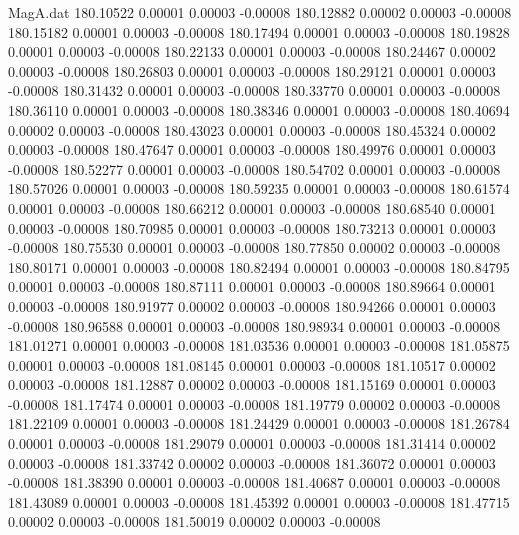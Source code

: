 \begin{filecontents}{MagA.dat}
 180.10522    0.00001    0.00003   -0.00008
 180.12882    0.00002    0.00003   -0.00008
 180.15182    0.00001    0.00003   -0.00008
 180.17494    0.00001    0.00003   -0.00008
 180.19828    0.00001    0.00003   -0.00008
 180.22133    0.00001    0.00003   -0.00008
 180.24467    0.00002    0.00003   -0.00008
 180.26803    0.00001    0.00003   -0.00008
 180.29121    0.00001    0.00003   -0.00008
 180.31432    0.00001    0.00003   -0.00008
 180.33770    0.00001    0.00003   -0.00008
 180.36110    0.00001    0.00003   -0.00008
 180.38346    0.00001    0.00003   -0.00008
 180.40694    0.00002    0.00003   -0.00008
 180.43023    0.00001    0.00003   -0.00008
 180.45324    0.00002    0.00003   -0.00008
 180.47647    0.00001    0.00003   -0.00008
 180.49976    0.00001    0.00003   -0.00008
 180.52277    0.00001    0.00003   -0.00008
 180.54702    0.00001    0.00003   -0.00008
 180.57026    0.00001    0.00003   -0.00008
 180.59235    0.00001    0.00003   -0.00008
 180.61574    0.00001    0.00003   -0.00008
 180.66212    0.00001    0.00003   -0.00008
 180.68540    0.00001    0.00003   -0.00008
 180.70985    0.00001    0.00003   -0.00008
 180.73213    0.00001    0.00003   -0.00008
 180.75530    0.00001    0.00003   -0.00008
 180.77850    0.00002    0.00003   -0.00008
 180.80171    0.00001    0.00003   -0.00008
 180.82494    0.00001    0.00003   -0.00008
 180.84795    0.00001    0.00003   -0.00008
 180.87111    0.00001    0.00003   -0.00008
 180.89664    0.00001    0.00003   -0.00008
 180.91977    0.00002    0.00003   -0.00008
 180.94266    0.00001    0.00003   -0.00008
 180.96588    0.00001    0.00003   -0.00008
 180.98934    0.00001    0.00003   -0.00008
 181.01271    0.00001    0.00003   -0.00008
 181.03536    0.00001    0.00003   -0.00008
 181.05875    0.00001    0.00003   -0.00008
 181.08145    0.00001    0.00003   -0.00008
 181.10517    0.00002    0.00003   -0.00008
 181.12887    0.00002    0.00003   -0.00008
 181.15169    0.00001    0.00003   -0.00008
 181.17474    0.00001    0.00003   -0.00008
 181.19779    0.00002    0.00003   -0.00008
 181.22109    0.00001    0.00003   -0.00008
 181.24429    0.00001    0.00003   -0.00008
 181.26784    0.00001    0.00003   -0.00008
 181.29079    0.00001    0.00003   -0.00008
 181.31414    0.00002    0.00003   -0.00008
 181.33742    0.00002    0.00003   -0.00008
 181.36072    0.00001    0.00003   -0.00008
 181.38390    0.00001    0.00003   -0.00008
 181.40687    0.00001    0.00003   -0.00008
 181.43089    0.00001    0.00003   -0.00008
 181.45392    0.00001    0.00003   -0.00008
 181.47715    0.00002    0.00003   -0.00008
 181.50019    0.00002    0.00003   -0.00008

\end{filecontents}
